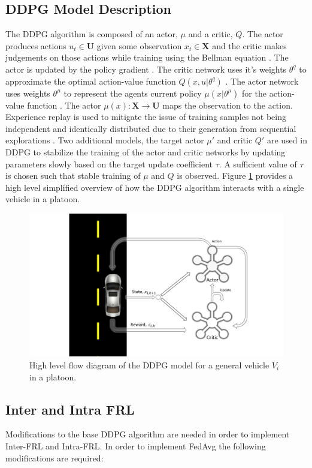 \subsection{DDPG Model Description}
The DDPG algorithm is composed of an actor, $\mu$ and a critic, $Q$. The actor produces
actions $u_t \in \mathbf{U}$ given some observation $x_t \in \mathbf{X}$ and the critic
makes judgements on those actions while training using the Bellman equation
\cite{Lillicrap2016, sutton2018reinforcement}. The actor is updated by the policy gradient
\cite{Lillicrap2016}.  The critic network uses it's weights $\theta^q$ to approximate the
optimal action-value function $Q(x, u|\theta^q)$ \cite{Lillicrap2016}.  The actor network
uses weights $\theta^\mu$ to represent the agents current policy $\mu(x|\theta^\mu)$ for
the action-value function \cite{Lillicrap2016}.  The actor
$\mu(x): \mathbf{X} \xrightarrow{} \mathbf{U}$ maps the observation to the action.
Experience replay is used to mitigate the issue of training samples not being independent
and identically distributed due to their generation from sequential explorations
\cite{Lillicrap2016}.  Two additional models, the target actor $\mu'$ and critic $Q'$
are used in DDPG to stabilize the training of the actor and critic networks by updating
parameters slowly based on the target update coefficient $\tau$.  A sufficient value of
$\tau$ is chosen such that stable training of $\mu$ and $Q$ is observed.
Figure \ref{fig:ddpgdraw} provides a high level simplified overview of how the DDPG
algorithm interacts with a single vehicle in a platoon.

\begin{figure}[H]
    \centering
    \includegraphics[width=0.6\linewidth]{assets/ddpg.PNG}
    \caption{High level flow diagram of the DDPG model for a general vehicle $V_i$ in a platoon.}
    \label{fig:ddpgdraw}
\end{figure}

\subsection{Inter and Intra FRL}
Modifications to the base DDPG algorithm are needed in order to implement Inter-FRL and
Intra-FRL.  In order to implement FedAvg the following modifications are required:


